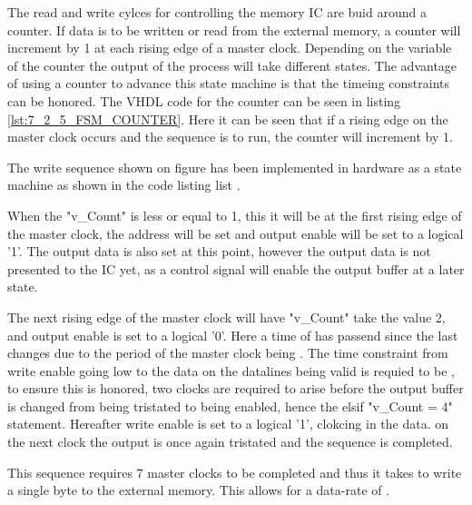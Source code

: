 The read and write cylces for controlling the memory IC are buid around a counter. If data is to be written or read from the external memory, a counter will increment by 1 at each rising edge of a  master clock. Depending on the variable of the counter the output of the process will take different states. The advantage of using a counter to advance this state machine is that the timeing constraints can be honored. The VHDL code for the counter can be seen in listing \ref{lst:7_2_5_FSM_COUNTER}. Here it can be seen that if a rising edge on the master clock occurs and the sequence is to run, the counter will increment by 1.



The write sequence shown on figure  has been implemented in hardware as a state machine as shown in the code listing list .



When the "v\_Count" is less or equal to 1, this it will be at the first rising edge of the master clock, the address will be set and output enable will be set to a logical '1'. The output data is also set at this point, however the output data is not presented to the IC yet, as a control signal will enable the output buffer at a later state. 

The next rising edge of the master clock will have "v\_Count" take the value 2, and output enable is set to a logical '0'. Here a time of  has passend since the last changes due to the period of the master clock being . The time constraint from write enable going low to the data on the datalines being valid is requied to be , to ensure this is honored, two clocks are required to arise before the output buffer is changed from being tristated to being enabled, hence the elsif "v\_Count = 4" statement. Hereafter write enable is set to a logical '1', clokcing in the data. on the next clock the output is once again tristated and the sequence is completed. 

This sequence requires 7 master clocks to be completed and thus it takes  to write a single byte to the external memory. This allows for a data-rate of .


